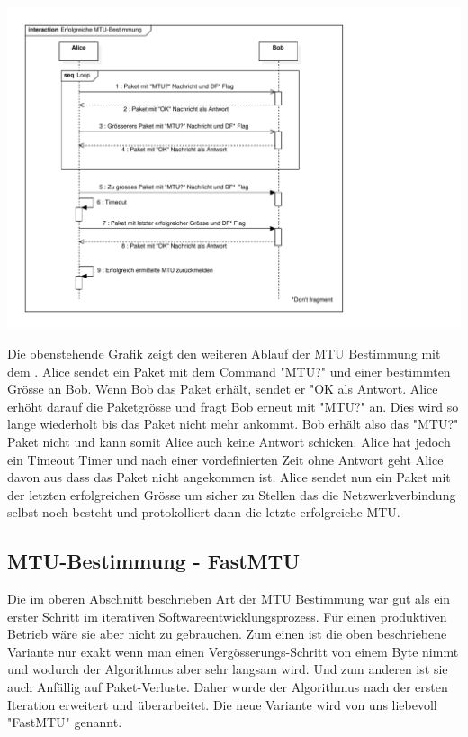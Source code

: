 \includegraphics[trim=10 10 200 10,clip,width=\textwidth]{mainpart/implementation/img/MTUBestimmungErfolgreich}

Die obenstehende Grafik zeigt den weiteren Ablauf der \acs{MTU} Bestimmung mit dem \tool. Alice sendet ein Paket mit dem Command "MTU?" und einer bestimmten Grösse an Bob. Wenn Bob das Paket erhält, sendet er "OK als Antwort. Alice erhöht darauf die Paketgrösse und fragt Bob erneut mit "MTU?" an. Dies wird so lange wiederholt bis das Paket nicht mehr ankommt. Bob erhält also das "MTU?" Paket nicht und kann somit Alice auch keine Antwort schicken. Alice hat jedoch ein Timeout Timer und nach einer vordefinierten Zeit ohne Antwort geht Alice davon aus dass das Paket nicht angekommen ist. Alice sendet nun ein Paket mit der letzten erfolgreichen Grösse um sicher zu Stellen das die Netzwerkverbindung selbst noch besteht und protokolliert dann die letzte erfolgreiche \acs{MTU}.

\subsection{MTU-Bestimmung - FastMTU}
Die im oberen Abschnitt beschrieben Art der \acs{MTU} Bestimmung war gut als ein erster Schritt im iterativen Softwareentwicklungsprozess. Für einen produktiven Betrieb wäre sie aber nicht zu gebrauchen. Zum einen ist die oben beschriebene Variante nur exakt wenn man einen Vergösserungs-Schritt von einem Byte nimmt und wodurch der Algorithmus aber sehr langsam wird. Und zum anderen ist sie auch Anfällig auf Paket-Verluste.
Daher wurde der Algorithmus nach der ersten Iteration erweitert und überarbeitet. Die neue Variante wird von uns liebevoll "FastMTU" genannt.

